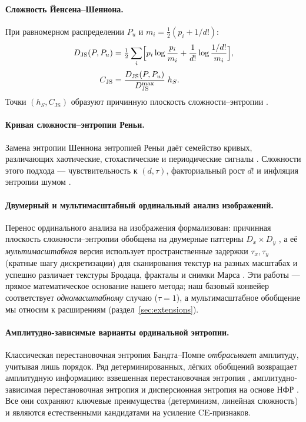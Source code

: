 \documentclass[14pt]{extarticle}
\theoremstyle{plain}
\numberwithin{equation}{section}
\numberwithin{figure}{section}
\numberwithin{table}{section}
\begin{document}
\paragraph{Сложность Йенсена–Шеннона.}
При равномерном распределении $P_u$ и $m_i=\tfrac12(p_i+1/d!)$:
\begin{align}
D_{\mathrm{JS}}(P,P_u) &=
\tfrac12\sum_{i}\Bigl[p_i\log\frac{p_i}{m_i}+
\frac{1}{d!}\log\frac{1/d!}{m_i}\Bigr],\\[2pt]
C_{\mathrm{JS}} &=
\frac{D_{\mathrm{JS}}(P,P_u)}{D_{\mathrm{JS}}^{\max}}\;h_S.
\end{align}
Точки $(h_S,C_{\mathrm{JS}})$ образуют причинную плоскость сложности–энтропии
\citep{PhysRevE.95.062106}.

\paragraph{Кривая сложности–энтропии Реньи.}
Замена энтропии Шеннона энтропией Реньи даёт семейство кривых, различающих
хаотические, стохастические и периодические сигналы
\citep{RePEc:eee:phsmap:v:498:y:2018:i:c:p:74-85}. Сложности этого подхода —
чувствительность к $(d,\tau)$, факториальный рост $d!$ и инфляция энтропии шумом
\citep{2016NTA.....7...21C}.

\paragraph{Двумерный и мультимасштабный ординальный анализ изображений.}
Перенос ординального анализа на изображения формализован: причинная плоскость
сложности–энтропии обобщена на двумерные паттерны $D_x\times D_y$
\citep{ribeiro2012complexity}, а её \emph{мультимасштабная} версия использует
пространственные задержки $\tau_x,\tau_y$ (кратные шагу дискретизации) для
сканирования текстур на разных масштабах и успешно различает текстуры Бродаца,
фракталы и снимки Марса \citep{zunino2016discriminating}. Эти работы — прямое
математическое основание нашего метода; наш базовый конвейер соответствует
\emph{одномасштабному} случаю ($\tau=1$), а мультимасштабное обобщение мы относим
к расширениям (раздел~\ref{sec:extensions}).

\paragraph{Амплитудно-зависимые варианты ординальной энтропии.}
Классическая перестановочная энтропия Бандта–Помпе \emph{отбрасывает} амплитуду,
учитывая лишь порядок. Ряд детерминированных, лёгких обобщений возвращает
амплитудную информацию: взвешенная перестановочная энтропия
\citep{fadlallah2013weighted}, амплитудно-зависимая перестановочная энтропия
\citep{azami2016amplitude} и дисперсионная энтропия на основе НФР
\citep{rostaghi2016dispersion}. Все они сохраняют ключевые преимущества
(детерминизм, линейная сложность) и являются естественными кандидатами на
усиление CE-признаков.
\end{document}
